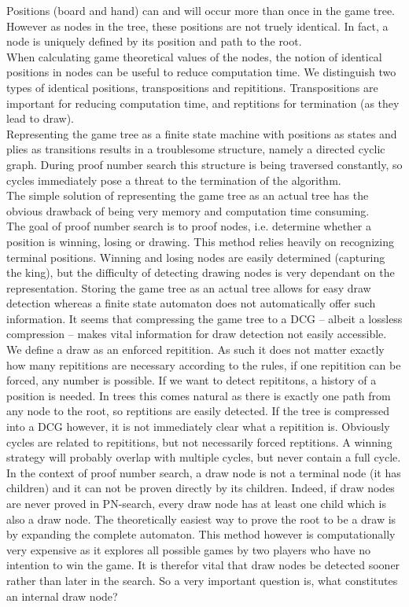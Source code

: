 \documentclass{article}
\begin{document}
Positions (board and hand) can and will occur more than once in the game tree. However as nodes in the tree, these positions are not truely identical. In fact, a node is uniquely defined by its position and path to the root.\\
When calculating game theoretical values of the nodes, the notion of identical positions in nodes can be useful to reduce computation time. We distinguish two types of identical positions, transpositions and repititions. Transpositions are important for reducing computation time, and reptitions for termination (as they lead to draw).\\
Representing the game tree as a finite state machine with positions as states and plies as transitions results in a troublesome structure, namely a directed cyclic graph. During proof number search this structure is being traversed constantly, so cycles immediately pose a threat to the termination of the algorithm.\\
The simple solution of representing the game tree as an actual tree has the obvious drawback of being very memory and computation time consuming.\\

The goal of proof number search is to proof nodes, i.e. determine whether a position is winning, losing or drawing. This method relies heavily on recognizing terminal positions. Winning and losing nodes are easily determined (capturing the king), but the difficulty of detecting drawing nodes is very dependant on the representation. Storing the game tree as an actual tree allows for easy draw detection whereas a finite state automaton does not automatically offer such information. It seems that compressing the game tree to a DCG -- albeit a lossless compression -- makes vital information for draw detection not easily accessible.\\

We define a draw as an enforced repitition. As such it does not matter exactly how many repititions are necessary according to the rules, if one repitition can be forced, any number is possible. If we want to detect repititons, a history of a position is needed. In trees this comes natural as there is exactly one path from any node to the root, so reptitions are easily detected. If the tree is compressed into a DCG however, it is not immediately clear what a repitition is. Obviously cycles are related to repititions, but not necessarily forced reptitions. A winning strategy will probably overlap with multiple cycles, but never contain a full cycle.\\

In the context of proof number search, a draw node is not a terminal node (it has children) and it can not be proven directly by its children. Indeed, if draw nodes are never proved in PN-search, every draw node has at least one child which is also a draw node. The theoretically easiest way to prove the root to be a draw is by expanding the complete automaton. This method however is computationally very expensive as it explores all possible games by two players who have no intention to win the game. It is therefor vital that draw nodes be detected sooner rather than later in the search. So a very important question is, what constitutes an internal draw node? 
\end{document}
